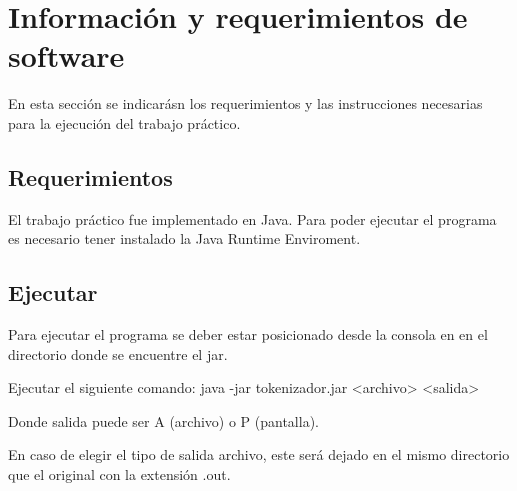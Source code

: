 \section{Informaci\'on y requerimientos de software}

En esta secci\'on se indicar\'asn los requerimientos y las instrucciones necesarias para la ejecuci\'on del trabajo pr\'actico.

\subsection{Requerimientos}

El trabajo pr\'actico fue implementado en Java. Para poder ejecutar el programa es necesario tener instalado la Java Runtime Enviroment. 

\subsection{Ejecutar}

Para ejecutar el programa se deber estar posicionado desde la consola en en el directorio donde se encuentre el jar.

Ejecutar el siguiente comando: java -jar tokenizador.jar <archivo> <salida>

Donde salida puede ser A (archivo) o P (pantalla). 

En caso de elegir el tipo de salida archivo, este ser\'a dejado en el mismo directorio que el original con la extensi\'on .out. 